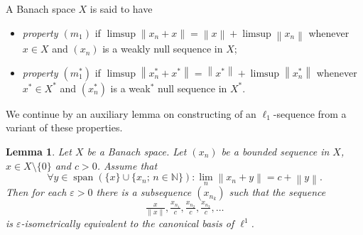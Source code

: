 \documentclass{amsart}
\numberwithin{equation}{section}
\newtheorem{lemma}[thm]{Lemma}
\theoremstyle{definition}
\def\ep{\varepsilon}
\def\en{\mathbb N}
\def\span{\operatorname{span}}
\newcommand{\norm}[1]{\left\|#1\right\|}
\newcommand{\setsep}{;\,}
\begin{document}
A Banach space $X$ is said to have
\begin{itemize}
    \item \emph{property $(m_1)$} if $\limsup\norm{x_n+x}=\norm{x}+\limsup\norm{x_n}$  whenever $x\in X$ and $(x_n)$ is a weakly null sequence in $X$;
    \item \emph{property $(m_1^*)$} if $\limsup\norm{x_n^*+x^*}=\norm{x^*}+\limsup\norm{x_n^*}$  whenever $x^*\in X^*$ and $(x_n^*)$ is a weak$^*$ null sequence in $X^*$.
\end{itemize}

We continue by an auxiliary lemma on constructing of an $\ell_1$-sequence from a variant of these properties.

\begin{lemma}\label{L:m1-ell1}
    Let $X$ be a Banach space. Let $(x_n)$ be a bounded sequence in $X$, $x\in X\setminus\{0\}$ and $c>0$. Assume that
    $$\forall y\in \span(\{x\}\cup\{x_n\setsep n\in\en\})\colon \lim_n\norm{x_n+y}=c+\norm{y}.$$
    Then for each $\ep>0$ there is a subsequence $(x_{n_k})$ such that the sequence
    $$\tfrac{x}{\norm{x}}, \tfrac{x_{n_1}}{c}, \tfrac{x_{n_2}}{c}, \tfrac{x_{n_3}}{c},\dots$$
    is $\ep$-isometrically equivalent to the canonical basis of $\ell^1$.
\end{lemma}
\end{document}
